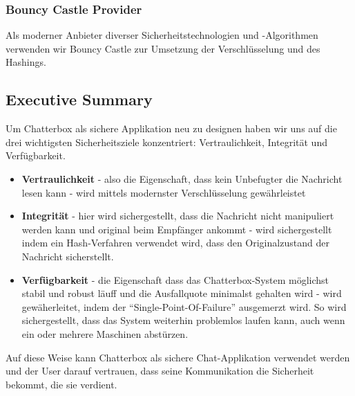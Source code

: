 \documentclass[12pt,a4paper,titlepage,oneside]{scrartcl}
\begin{document}
\subsubsection{Bouncy Castle Provider}
Als moderner Anbieter diverser Sicherheitstechnologien und -Algorithmen verwenden wir Bouncy Castle zur Umsetzung der Verschl\"{u}sselung und des Hashings.


\subsection{Executive Summary}
Um Chatterbox als sichere Applikation neu zu designen haben wir uns auf die drei wichtigsten Sicherheitsziele konzentriert: Vertraulichkeit, Integrit\"at und Verf\"{u}gbarkeit.
\begin{itemize}
\item \textbf{Vertraulichkeit} - also die Eigenschaft, dass kein Unbefugter die Nachricht lesen kann - wird mittels modernster Verschl\"{u}sselung gew\"{a}hrleistet
\item \textbf{Integrit\"{a}t} - hier wird sichergestellt, dass die Nachricht nicht manipuliert werden kann und original beim Empf\"{a}nger ankommt - wird sichergestellt indem ein Hash-Verfahren verwendet wird, dass den Originalzustand der Nachricht  sicherstellt.
\item \textbf{Verf\"{u}gbarkeit} - die Eigenschaft dass das Chatterbox-System m\"{o}glichst stabil und robust l\"{a}uff und die Ausfallquote minimalst gehalten wird - wird gew\"{a}herleitet, indem der ``Single-Point-Of-Failure'' ausgemerzt wird. So wird sichergestellt, dass das System weiterhin problemlos laufen kann, auch wenn ein oder mehrere Maschinen abst\"{u}rzen.
\end{itemize}
Auf diese Weise kann Chatterbox als sichere Chat-Applikation verwendet werden und der User darauf vertrauen, dass seine Kommunikation die Sicherheit bekommt, die sie verdient.

%
%
\end{document}
